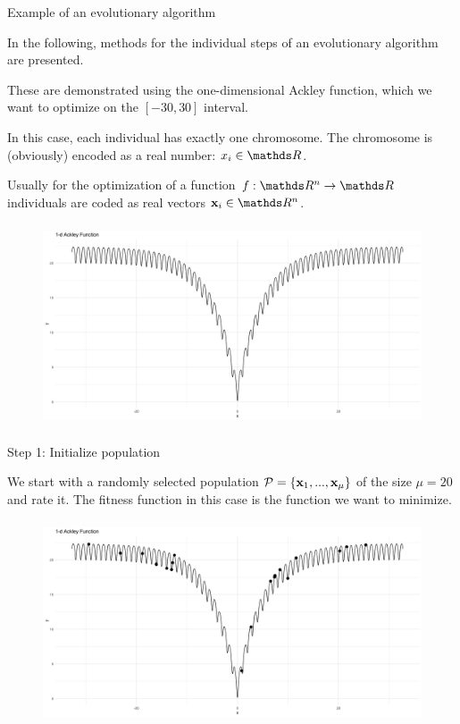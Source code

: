 \begin{frame}[allowframebreaks]{Example of an evolutionary algorithm}

In the following, methods for the individual steps of an evolutionary algorithm are presented.

\vspace{0.5cm}

These are demonstrated using the one-dimensional Ackley function, which we want to optimize on the $[-30, 30]$ interval.

\vspace{0.5cm}

In this case, each individual has exactly one chromosome. The chromosome is (obviously) encoded as a real number: $x_i \in \R$.

Usually for the optimization of a function $f:\R^n \to \R$ individuals are coded as real vectors $\x_i \in \R^n$.


\framebreak


\begin{center}
\begin{figure}
\includegraphics[width=\textwidth, height=6cm]{images/ea_ex1.png}
\end{figure}
\end{center}

\end{frame}


\begin{frame}{Step 1: Initialize population}

We start with a randomly selected population $\mathcal{P} = \{\mathbf{x}_1, ..., \mathbf{x}_\mu\}$ of the size $\mu = 20$ and rate it. The fitness function in this case is the function we want to minimize.


\begin{center}
\begin{figure}
\includegraphics[width=\textwidth, height=6cm]{images/ea_ex2.png}
\end{figure}
\end{center}


\end{frame}

